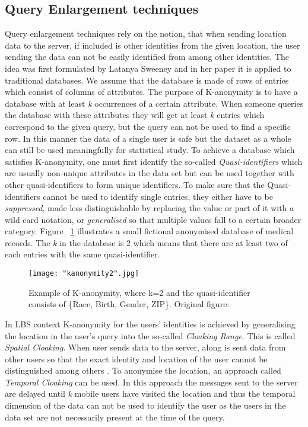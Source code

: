 \documentclass[english]{tktltiki2}
\theoremstyle{definition}
\theoremstyle{remark}
\begin{document}
\subsection{Query Enlargement techniques}

Query enlargement techniques rely on the notion, that when sending location data to the server, if included is other identities from the given location, the user sending the data can not be easily identified from among other identities. The idea was first formulated by Latanya Sweeney\cite{Sweeney:2002:KAM:774544.774552} and in her paper it is applied to traditional databases. We assume that the database is made of rows of entries which consist of columns of attributes. The purpose of K-anonymity is to have a database with at least \textit{k} occurrences of a certain attribute. When someone queries the database with these attributes they will get at least \textit{k} entries which correspond to the given query, but the query can not be used to find a specific row. In this manner the data of a single user is safe but the dataset as a whole can still be used meaningfully for statistical study. To achieve a database which satisfies K-anonymity, one must first identify the so-called \textit{Quasi-identifiers} which are usually non-unique attributes in the data set but can be used together with other quasi-identifiers to form unique identifiers. To make sure that the Quasi-identifiers cannot be used to identify single entries, they either have to be \textit{suppressed}, made less distinguishable by replacing the value or part of it with a wild card notation, or \textit{generalised} so that multiple values fall to a certain broader category. Figure ~\ref{fig:kanonymity2} illustrates a small fictional anonymised database of medical records. The \textit{k} in the database is 2 which means that there are at least two of each entries with the same quasi-identifier.

\begin{figure}[H]
\centering
{}
\texttt{[image: "kanonymity2".jpg]}
\caption{Example of K-anonymity, where k=2 and the quasi-identifier consists of \{Race, Birth, Gender, ZIP\}. Original figure: \cite{Sweeney:2002:KAM:774544.774552} }
\label{fig:kanonymity2}
\end{figure} 

In LBS context K-anonymity for the users' identities is achieved by generalising the location in the user's query into the so-called \textit{Cloaking Range}. This is called \textit{Spatial Cloaking}. When user sends data to the server, along is sent data from other users so that the exact identity and location of the user cannot be distinguished among others \cite{Gedik2008}. To anonymise the location, an approach called \textit{Temporal Cloaking} can be used. In this approach the messages sent to the server are delayed until \textit{k} mobile users have visited the location and thus the temporal dimension of the data can not be used to identify the user as the users in the data set are not necessarily present at the time of the query.
\end{document}
